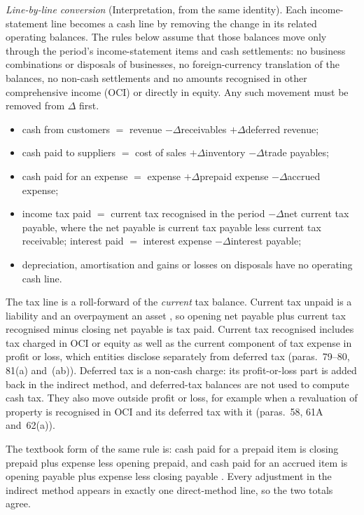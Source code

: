 \begin{qfmethod}
\emph{Line-by-line conversion} (Interpretation, from the same identity). Each income-statement line becomes a cash line by removing the change in its related operating balances. The rules below assume that those balances move only through the period's income-statement items and cash settlements: no business combinations or disposals of businesses, no foreign-currency translation of the balances, no non-cash settlements and no amounts recognised in other comprehensive income (OCI) or directly in equity. Any such movement must be removed from $\Delta$ first.
\begin{itemize}
\item cash from customers $=$ revenue $-\Delta$receivables $+\Delta$deferred revenue;
\item cash paid to suppliers $=$ cost of sales $+\Delta$inventory $-\Delta$trade payables;
\item cash paid for an expense $=$ expense $+\Delta$prepaid expense $-\Delta$accrued expense;
\item income tax paid $=$ current tax recognised in the period $-\Delta$net current tax payable, where the net payable is current tax payable less current tax receivable; interest paid $=$ interest expense $-\Delta$interest payable;
\item depreciation, amortisation and gains or losses on disposals have no operating cash line.
\end{itemize}
The tax line is a roll-forward of the \emph{current} tax balance. Current tax unpaid is a liability and an overpayment an asset \citep[IAS~12 para.~12]{eu-2023-1803-ias12}, so opening net payable plus current tax recognised minus closing net payable is tax paid. Current tax recognised includes tax charged in OCI or equity as well as the current component of tax expense in profit or loss, which entities disclose separately from deferred tax (paras.~79--80, 81(a) and~(ab)). Deferred tax is a non-cash charge: its profit-or-loss part is added back in the indirect method, and deferred-tax balances are not used to compute cash tax. They also move outside profit or loss, for example when a revaluation of property is recognised in OCI and its deferred tax with it (paras.~58, 61A and~62(a)).

The textbook form of the same rule is: cash paid for a prepaid item is closing prepaid plus expense less opening prepaid, and cash paid for an accrued item is opening payable plus expense less closing payable \citep[sec.~16.6]{principles-financial-accounting-2019}. Every adjustment in the indirect method appears in exactly one direct-method line, so the two totals agree.


\end{qfmethod}
